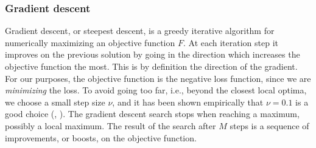 \subsubsection{Gradient descent}
Gradient descent, or steepest descent, is a greedy iterative algorithm for numerically maximizing an objective function $F$. At each iteration step it improves on the previous solution by going in the direction which increases the objective function the most. This is by definition  the direction of the gradient. For our purposes, the objective function is the negative loss function, since we are \textit{minimizing} the loss. To avoid going too far, i.e., beyond the closest local optima, we choose a small step size $\nu$, and it has been shown empirically that $\nu=0.1$ is a good choice (\cite{buhlmann-yu}, \cite{buhlmann2006}). The gradient descent search stops when reaching a maximum, possibly a local maximum. The result of the search after $M$ steps is a sequence of improvements, or boosts, on the objective function.

